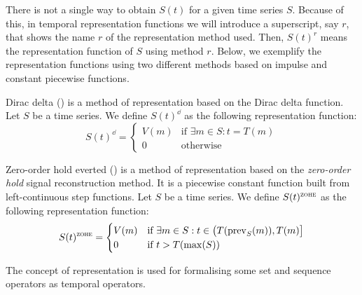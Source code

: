 There is not a single way to obtain $S(t)$ for a given time series
$S$. Because of this, in temporal representation functions we will
introduce a superscript, say $r$, that shows the name $r$ of the
representation method used. Then, $S(t)^r$ means the representation
function of $S$ using method $r$. Below, we exemplify the
representation functions using two different methods based on impulse
and constant piecewise functions.


\begin{definition} 
  Dirac delta (\dd) is a method of representation based on the Dirac
  delta function. Let $S$ be a time series. We define $S(t)^\dd$ as
  the following \dd{} representation function:
  \[
  S(t)^\dd
  =  \begin{cases}
          V(m) & \text{if } \exists m\in S:t=T(m) \\
          0    & \text{otherwise}
  \end{cases}
  \]
\end{definition}

\begin{definition}
  Zero-order hold everted (\zohe{}) is a method of representation
  based on the \emph{zero-order hold} signal reconstruction method. It
  is a piecewise constant function built from left-continuous step
  functions.  Let $S$ be a time series. We define $S(t)^\zohe$ as the
  following representation function:
  \[
  S(t)^\zohe 
  = \begin{cases}
    V(m) & \text{if } \exists m\in S: t\in \big(T(\prev_S(m)),T(m)\big]\\
    0    & \text{if } t > T(\max(S)) 
  \end{cases}
  \]
\end{definition}




The concept of representation is used for formalising some set and
sequence operators as temporal operators. 



